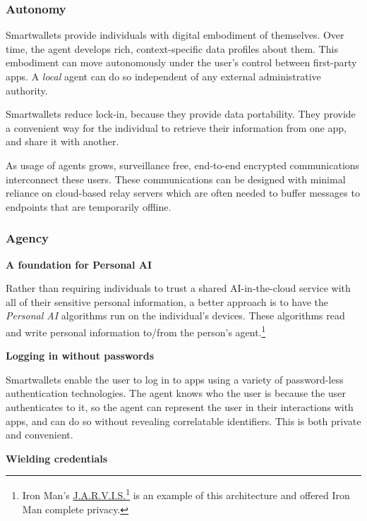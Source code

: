 \documentclass[11pt, oneside]{article}   	%
\newcommand{\hyperfootnote}[1][]{\def\ArgI{{#1}}\hyperfootnoteRelay}
\newcommand\hyperfootnoteRelay[2][]{\href{#1#2}{\ArgI}\footnote{\href{#1#2}{#2}}}
\begin{document}
\subsubsection{Autonomy}

Smartwallets provide individuals with digital embodiment of themselves. Over time, the agent develops rich, context-specific data profiles about them. This embodiment can move autonomously under the user's control between first-party apps. A \emph{local} agent can do so independent of any external administrative authority. 

Smartwallets reduce lock-in, because they provide data portability. They provide a convenient way for the individual to retrieve their information from one app, and share it with another. 

As usage of agents grows, surveillance free, end-to-end encrypted communications interconnect these users. These communications can be designed with minimal reliance on cloud-based relay servers which are often needed to buffer messages to endpoints that are temporarily offline.

\subsubsection{Agency}

\textbf{A foundation for Personal AI}

Rather than requiring individuals to trust a shared AI-in-the-cloud service with all of their sensitive personal information, a better approach is to have the \emph{Personal AI} algorithms run on the individual's devices. These algorithms read and write personal information to/from the person's agent.\footnote{Iron Man's \hyperfootnote[J.A.R.V.I.S.][https://]{en.wikipedia.org/wiki/J.A.R.V.I.S.} is an example of this architecture and offered Iron Man complete privacy.}

\textbf{Logging in without passwords}

Smartwallets enable the user to log in to apps using a variety of password-less authentication technologies. The agent knows who the user is because the user authenticates to it, so the agent can represent the user in their interactions with apps, and can do so without revealing correlatable identifiers. This is both private and convenient.

\textbf{Wielding credentials}
\end{document}
